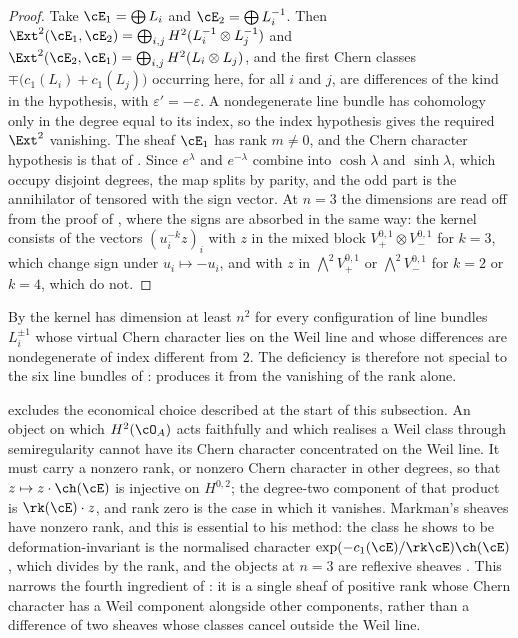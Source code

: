 \begin{proof}
Take $\cE_{1}=\bigoplus L_{i}$ and $\cE_{2}=\bigoplus L_{i}^{-1}$. Then
$\Ext^{2}(\cE_{1},\cE_{2})=\bigoplus_{i,j}H^{2}(L_{i}^{-1}\otimes L_{j}^{-1})$
and $\Ext^{2}(\cE_{2},\cE_{1})=\bigoplus_{i,j}H^{2}(L_{i}\otimes L_{j})$, and
the first Chern classes $\mp\bigl(c_{1}(L_{i})+c_{1}(L_{j})\bigr)$ occurring
here, for all $i$ and $j$, are differences of the kind in the hypothesis,
with $\varepsilon'=-\varepsilon$. A nondegenerate line bundle has cohomology only in
the degree equal to its index, so the index hypothesis gives the required
$\Ext^{2}$ vanishing. The sheaf $\cE_{1}$ has rank $m\ne0$, and the Chern
character hypothesis is that of .
Since $e^{\lambda}$ and $e^{-\lambda}$ combine into $\cosh\lambda$ and
$\sinh\lambda$, which occupy disjoint degrees, the map splits by parity, and
the odd part is the annihilator of  tensored with the
sign vector. At $n=3$ the dimensions are read off from the proof of
\cite[Proposition~4.14]{paperII}, where the signs are absorbed in the same way:
the kernel consists of the vectors $(u_{i}^{-k}z)_{i}$ with $z$ in the mixed
block $V_{+}^{0,1}\otimes V_{-}^{0,1}$ for $k=3$, which change sign under
$u_{i}\mapsto-u_{i}$, and with $z$ in $\bigwedge^{2}V_{+}^{0,1}$ or
$\bigwedge^{2}V_{-}^{0,1}$ for $k=2$ or $k=4$, which do not.
\end{proof}

\begin{remark}
\label{rem:familyuniform}
By  the kernel has dimension at least $n^{2}$ for
every configuration of line bundles $L_{i}^{\pm1}$ whose virtual Chern
character lies on the Weil line and whose differences are nondegenerate of
index different from $2$. The deficiency is therefore not special to the six
line bundles of \cite[Proposition~4.14]{paperII}:  produces it
from the vanishing of the rank alone.

 excludes the economical choice described at the start of
this subsection. An object on which $H^{2}(\cO_{A})$ acts faithfully and which
realises a Weil class through semiregularity cannot have its Chern character
concentrated on the Weil line. It must carry a nonzero rank, or nonzero Chern
character in other degrees, so that $z\mapsto z\cdot\ch(\cE)$ is injective on
$H^{0,2}$; the degree-two component of that product is $\rk(\cE)\cdot z$, and
rank zero is the case in which it vanishes. Markman's sheaves have nonzero
rank, and this is essential to his method: the class he shows to be
deformation-invariant is the normalised character
$\exp(-c_{1}(\cE)/\rk\cE)\ch(\cE)$, which divides by the rank, and the objects
at $n=3$ are reflexive sheaves \cite{Mar25a,Mar25b}. This narrows the fourth
ingredient of : it is a single sheaf of positive rank
whose Chern character has a Weil component alongside other components, rather
than a difference of two sheaves whose classes cancel outside the Weil line.
\end{remark}

